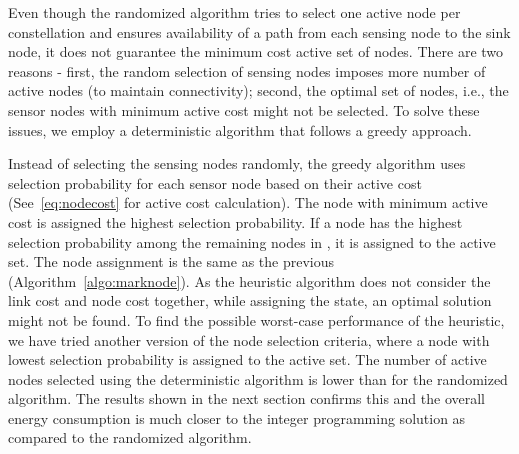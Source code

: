 \documentclass[conference]{IEEEtran}
\begin{document}
Even though the randomized algorithm tries to select one active node per constellation and ensures availability of a path from each sensing node to the sink node, it does not guarantee the minimum cost active set of nodes. There are two reasons - first, the random selection of sensing nodes imposes more number of active nodes (to maintain connectivity); second, the optimal set of nodes, i.e., the sensor nodes with minimum active cost might not be selected. To solve these issues, we employ a deterministic algorithm that follows a greedy approach. 

Instead of selecting the sensing nodes randomly, the greedy algorithm uses selection probability for each sensor node based on their active cost (See~\ref{eq:nodecost} for active cost calculation). The node with minimum active cost is assigned the highest selection probability. If a node has the highest selection probability among the remaining nodes in , it is assigned to the active set. The node assignment is the same as the previous (Algorithm~\ref{algo:marknode}). As the heuristic algorithm does not consider the link cost and node cost together, while assigning the state, an optimal solution might not be found. To find the possible worst-case performance of the heuristic, we have tried another version of the node selection criteria, where a node with lowest selection probability is assigned to the active set. The number of active nodes selected using the deterministic algorithm is lower than for the randomized algorithm. The results shown in the next section confirms this and the overall energy consumption is much closer to the integer programming solution as compared to the randomized algorithm.
\end{document}
